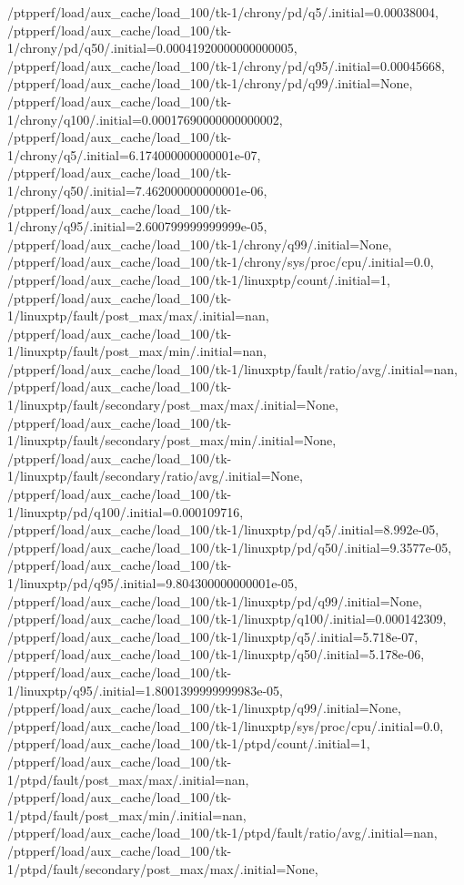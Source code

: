 {    /ptpperf/load/aux_cache/load_100/tk-1/chrony/pd/q5/.initial=0.00038004,
    /ptpperf/load/aux_cache/load_100/tk-1/chrony/pd/q50/.initial=0.00041920000000000005,
    /ptpperf/load/aux_cache/load_100/tk-1/chrony/pd/q95/.initial=0.00045668,
    /ptpperf/load/aux_cache/load_100/tk-1/chrony/pd/q99/.initial=None,
    /ptpperf/load/aux_cache/load_100/tk-1/chrony/q100/.initial=0.00017690000000000002,
    /ptpperf/load/aux_cache/load_100/tk-1/chrony/q5/.initial=6.174000000000001e-07,
    /ptpperf/load/aux_cache/load_100/tk-1/chrony/q50/.initial=7.462000000000001e-06,
    /ptpperf/load/aux_cache/load_100/tk-1/chrony/q95/.initial=2.600799999999999e-05,
    /ptpperf/load/aux_cache/load_100/tk-1/chrony/q99/.initial=None,
    /ptpperf/load/aux_cache/load_100/tk-1/chrony/sys/proc/cpu/.initial=0.0,
    /ptpperf/load/aux_cache/load_100/tk-1/linuxptp/count/.initial=1,
    /ptpperf/load/aux_cache/load_100/tk-1/linuxptp/fault/post_max/max/.initial=nan,
    /ptpperf/load/aux_cache/load_100/tk-1/linuxptp/fault/post_max/min/.initial=nan,
    /ptpperf/load/aux_cache/load_100/tk-1/linuxptp/fault/ratio/avg/.initial=nan,
    /ptpperf/load/aux_cache/load_100/tk-1/linuxptp/fault/secondary/post_max/max/.initial=None,
    /ptpperf/load/aux_cache/load_100/tk-1/linuxptp/fault/secondary/post_max/min/.initial=None,
    /ptpperf/load/aux_cache/load_100/tk-1/linuxptp/fault/secondary/ratio/avg/.initial=None,
    /ptpperf/load/aux_cache/load_100/tk-1/linuxptp/pd/q100/.initial=0.000109716,
    /ptpperf/load/aux_cache/load_100/tk-1/linuxptp/pd/q5/.initial=8.992e-05,
    /ptpperf/load/aux_cache/load_100/tk-1/linuxptp/pd/q50/.initial=9.3577e-05,
    /ptpperf/load/aux_cache/load_100/tk-1/linuxptp/pd/q95/.initial=9.804300000000001e-05,
    /ptpperf/load/aux_cache/load_100/tk-1/linuxptp/pd/q99/.initial=None,
    /ptpperf/load/aux_cache/load_100/tk-1/linuxptp/q100/.initial=0.000142309,
    /ptpperf/load/aux_cache/load_100/tk-1/linuxptp/q5/.initial=5.718e-07,
    /ptpperf/load/aux_cache/load_100/tk-1/linuxptp/q50/.initial=5.178e-06,
    /ptpperf/load/aux_cache/load_100/tk-1/linuxptp/q95/.initial=1.8001399999999983e-05,
    /ptpperf/load/aux_cache/load_100/tk-1/linuxptp/q99/.initial=None,
    /ptpperf/load/aux_cache/load_100/tk-1/linuxptp/sys/proc/cpu/.initial=0.0,
    /ptpperf/load/aux_cache/load_100/tk-1/ptpd/count/.initial=1,
    /ptpperf/load/aux_cache/load_100/tk-1/ptpd/fault/post_max/max/.initial=nan,
    /ptpperf/load/aux_cache/load_100/tk-1/ptpd/fault/post_max/min/.initial=nan,
    /ptpperf/load/aux_cache/load_100/tk-1/ptpd/fault/ratio/avg/.initial=nan,
    /ptpperf/load/aux_cache/load_100/tk-1/ptpd/fault/secondary/post_max/max/.initial=None,
}
